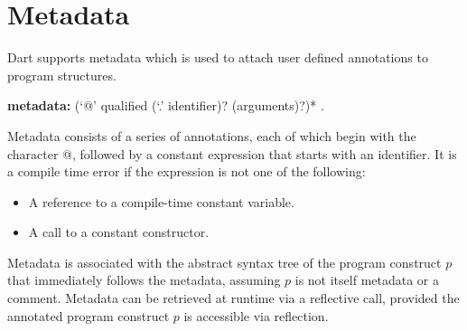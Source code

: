 \documentclass{article}
\begin{document}



\section{Metadata}

\LMHash{}
Dart supports metadata which is used to attach user defined annotations to program structures.  

\begin{grammar}
{\bf metadata:}
      (`@' qualified ({\escapegrammar `.'} identifier)? (arguments)?)*
    .
\end{grammar}

\LMHash{}
Metadata consists of a series of annotations, each of which begin with the character @, followed by  a constant expression that starts with an identifier. It is a compile time error if the expression is not one of the following:
\begin{itemize}
\item A reference to a compile-time constant variable.
\item A call to a constant constructor.
\end{itemize}

\LMHash{}
Metadata is associated with the abstract syntax tree of the program construct $p$ that immediately follows the metadata, assuming $p$ is not itself metadata or a comment. Metadata can be retrieved at runtime via a reflective call, provided the annotated program construct $p$ is accessible via reflection.
\end{document}
